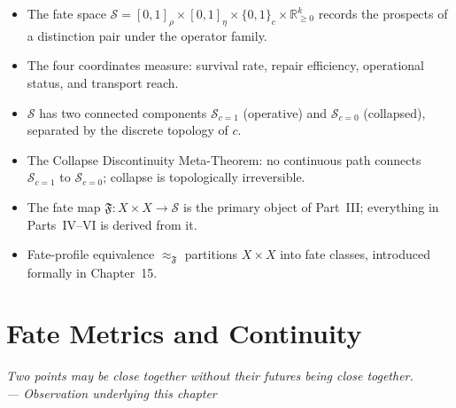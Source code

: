 \documentclass[12pt,twoside,openright]{book}
\newcommand{\fateMap}{\mathfrak{F}}
\newcommand{\fateSpace}{\mathcal{S}}
\newcommand{\survRatio}{\rho}             %
\newcommand{\repEff}{\eta}               %
\newcommand{\collapseInd}{c}             %
\newcommand{\fateComp}[1]{\fateSpace_{\collapseInd=#1}}
\newenvironment{epigraph}[2]{%
  \vspace{1em}\begin{flushright}
  \begin{minipage}{0.72\textwidth}
  \itshape\small #1\\[0.4em]
  \upshape\footnotesize\sffamily\color{DistGray}--- #2
  \end{minipage}\end{flushright}\vspace{1.5em}}{}
\newenvironment{chapsummary}{%
  \begin{tcolorbox}[colback=DistBlue!5,colframe=DistBlue,
    title={\faBookOpen\enspace Summary},
    fonttitle=\sffamily\bfseries\color{white},
    attach boxed title to top left={yshift=-2mm,xshift=4mm},
    boxed title style={colback=DistBlue,rounded corners}]
  \begin{itemize}[nosep,leftmargin=*]}{%
  \end{itemize}\end{tcolorbox}}
\providecommand{\fateComp}[1]{\fateSpace_{\collapseInd=#1}}
\begin{document}
\begin{chapsummary}
\item The fate space $\fateSpace=[0,1]_\survRatio\times
  [0,1]_\repEff\times\{0,1\}_\collapseInd\times\mathbb{R}_{\ge0}^k$
  records the prospects of a distinction pair under the
  operator family.
\item The four coordinates measure: survival rate, repair
  efficiency, operational status, and transport reach.
\item $\fateSpace$ has two connected components $\fateComp{1}$
  (operative) and $\fateComp{0}$ (collapsed), separated by
  the discrete topology of $\collapseInd$.
\item The Collapse Discontinuity Meta-Theorem: no continuous
  path connects $\fateComp{1}$ to $\fateComp{0}$; collapse
  is topologically irreversible.
\item The fate map $\fateMap:X\times X\to\fateSpace$ is the
  primary object of Part~III; everything in Parts~IV--VI is
  derived from it.
\item Fate-profile equivalence $\approx_\fateMap$ partitions
  $X\times X$ into fate classes, introduced formally in
  Chapter~15.
\end{chapsummary}







\chapter{Fate Metrics and Continuity}
\label{ch:fate-metrics}

\begin{epigraph}{Two points may be close together without their
  futures being close together.}{Observation underlying this chapter}
\end{epigraph}
\end{document}
